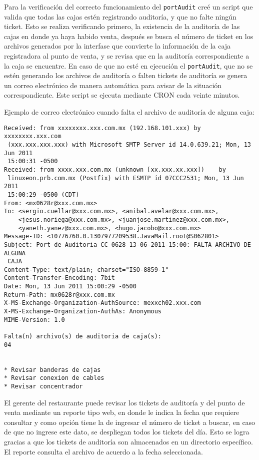 Para la verificación del correcto funcionamiento del \texttt{portAudit} creé un script que valida que todas las cajas estén registrando auditoría, y que no falte ningún ticket. Esto se realiza verificando primero, la existencia de la auditoría de las cajas en donde ya haya habido venta, después se busca el número de ticket en los archivos generados por la interfase que convierte la información de la caja registradora al punto de venta, y se revisa que en la auditoría correspondiente a la caja se encuentre. En caso de que no esté en ejecución el \texttt{portAudit}, que no se estén generando los archivos de auditoría o falten tickets de auditoría se genera un correo electrónico de manera automática para avisar de la situación correspondiente. Este script se ejecuta mediante CRON cada veinte minutos.

Ejemplo de correo electrónico cuando falta el archivo de auditoría de alguna caja:

\begin{Verbatim}[fontsize=\tiny]
Received: from xxxxxxxx.xxx.com.mx (192.168.101.xxx) by xxxxxxxx.xxx.com
 (xxx.xxx.xxx.xxx) with Microsoft SMTP Server id 14.0.639.21; Mon, 13 Jun 2011
 15:00:31 -0500
Received: from xxxx.xxx.com.mx (unknown [xx.xxx.xx.xxx])	by
 linuxeon.prb.com.mx (Postfix) with ESMTP id 07CCC2531;	Mon, 13 Jun 2011
 15:00:29 -0500 (CDT)
From: <mx0628r@xxx.com.mx>
To: <sergio.cuellar@xxx.com.mx>, <anibal.avelar@xxx.com.mx>,
	<jesus.noriega@xxx.com.mx>, <juanjose.martinez@xxx.com.mx>,
	<yaneth.yanez@xxx.com.mx>, <hugo.jacobo@xxx.com.mx>
Message-ID: <10776760.0.1307977209538.JavaMail.root@S062801>
Subject: Port de Auditoria CC 0628 13-06-2011-15:00: FALTA ARCHIVO DE ALGUNA
 CAJA
Content-Type: text/plain; charset="ISO-8859-1"
Content-Transfer-Encoding: 7bit
Date: Mon, 13 Jun 2011 15:00:29 -0500
Return-Path: mx0628r@xxx.com.mx
X-MS-Exchange-Organization-AuthSource: mexxch02.xxx.com
X-MS-Exchange-Organization-AuthAs: Anonymous
MIME-Version: 1.0

Falta(n) archivo(s) de auditoria de caja(s):
04


* Revisar banderas de cajas
* Revisar conexion de cables
* Revisar concentrador
\end{Verbatim}

El gerente del restaurante puede revisar los tickets de auditoría y del punto de venta mediante un reporte tipo web, en donde le indica la fecha que requiere consultar y como opción tiene la de ingresar el número de ticket a buscar, en caso de que no ingrese este dato, se despliegan todos los tickets del día. Esto se logra gracias a que los tickets de auditoría son almacenados en un directorio específico. El reporte consulta el archivo de acuerdo a la fecha seleccionada. 


